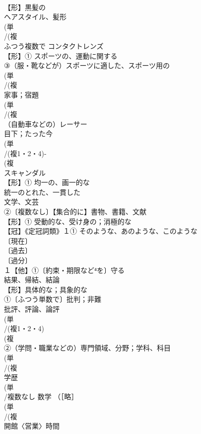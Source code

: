 \documentclass[8pt]{extreport}
\begin{document}
\begin{CJK}{UTF8}{min}
\\	【形】黒髪の
\\	ヘアスタイル、髪形 
\\	(単
\\	/(複
\\	ふつう複数で コンタクトレンズ
\\	【形】① スポーツの、運動に関する 
\\	③（服・靴などが）スポーツに適した、スポーツ用の
\\	(単
\\	/(複
\\	家事；宿題
\\	(単
\\	/(複
\\	（自動車などの）レーサー
\\	目下；たった今
\\	(単
\\	/(複1・2・4)-
\\	(複
\\	スキャンダル 
\\	【形】① 均一の、画一的な　
\\	統一のとれた、一貫した
\\	文学、文芸 
\\	②〔複数なし〕【集合的に】書物、書籍、文献
\\	【形】① 受動的な、受け身の；消極的な 
\\	【冠】《定冠詞類》１① そのような、あのような、このような 
\\	〔現在〕
\\	〔過去〕
\\	〔過分〕
\\	１【他】①〔約束・期限など⁴を〕守る
\\	結果、帰結、結論 
\\	【形】具体的な；具象的な 
\\	①〔ふつう単数で〕批判；非難 
\\	批評、評論、論評
\\	(単
\\	/(複1・2・4)
\\	(複
\\	②（学問・職業などの）専門領域、分野；学科、科目
\\	(単
\\	/(複
\\	学歴
\\	(単
\\	/複数なし 数学 （［略］
\\	(単
\\	/(複
\\	開館〈営業〉時間

\end{CJK}
\end{document}
